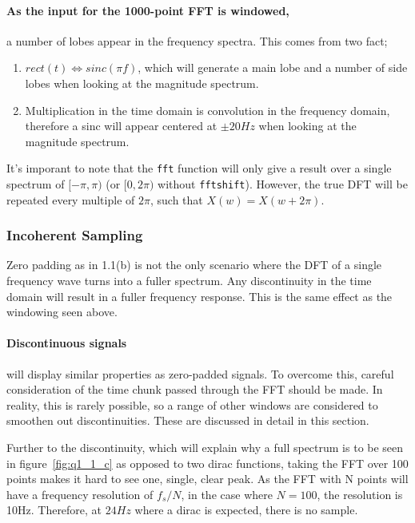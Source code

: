 \documentclass[main.tex]{subfiles}
\begin{document}
\paragraph{As the input for the 1000-point FFT is windowed,} a number of lobes appear in the frequency spectra. This comes from two fact; 
\begin{enumerate}
	\item $rect(t) \Leftrightarrow sinc(\pi f)$, which will generate a main lobe and a number of side lobes when looking at the magnitude spectrum.
	\item Multiplication in the time domain is convolution in the frequency domain, therefore a sinc will appear centered at $\pm 20Hz$ when looking at the magnitude spectrum.
\end{enumerate}

It's imporant to note that the {\tt fft} function will only give a result over a single spectrum of $[-\pi,\pi)$ (or $[0, 2\pi)$ without {\tt fftshift}). However, the true DFT will be repeated every multiple of $2\pi$, such that $X(w) = X(w+2\pi)$.

\subsubsection{Incoherent Sampling}

Zero padding as in 1.1(b) is not the only scenario where the DFT of a single frequency wave turns into a fuller spectrum. Any discontinuity in the time domain will result in a fuller frequency response. This is the same effect as the windowing seen above. 

\paragraph{Discontinuous signals} will display similar properties as zero-padded signals. To overcome this, careful consideration of the time chunk passed through the FFT should be made. In reality, this is rarely possible, so a range of other windows are considered to smoothen out discontinuities. These are discussed in detail in this section.

Further to the discontinuity, which will explain why a full spectrum is to be seen in figure~\ref{fig:q1_1_c} as opposed to two dirac functions, taking the FFT over 100 points makes it hard to see one, single, clear peak. As the FFT with N points will have a frequency resolution of $f_s/N$, in the case where $N=100$, the resolution is 10Hz. Therefore, at $24Hz$ where a dirac is expected, there is no sample.
\end{document}
